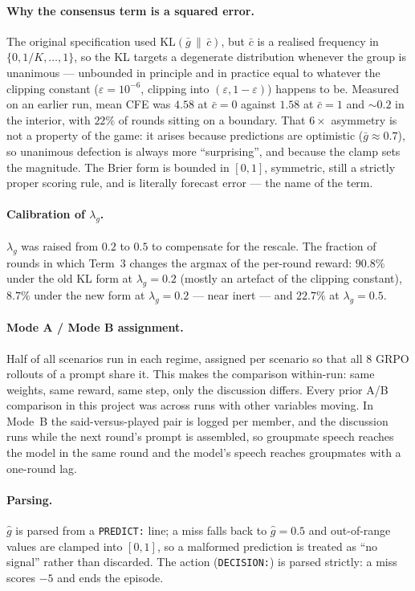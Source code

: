 \documentclass{article}
\begin{document}
\paragraph{Why the consensus term is a squared error.} The original
specification used $\mathrm{KL}(\bar g \,\|\, \bar c)$, but $\bar c$ is a
realised frequency in $\{0, 1/K, \dots, 1\}$, so the KL targets a degenerate
distribution whenever the group is unanimous --- unbounded in principle and in
practice equal to whatever the clipping constant ($\varepsilon = 10^{-6}$,
clipping into $(\varepsilon, 1-\varepsilon)$) happens to be. Measured on an
earlier run, mean CFE was $4.58$ at $\bar c = 0$ against $1.58$ at
$\bar c = 1$ and ${\sim}0.2$ in the interior, with $22\%$ of rounds sitting on
a boundary. That $6\times$ asymmetry is not a property of the game: it arises
because predictions are optimistic ($\bar g \approx 0.7$), so unanimous
defection is always more ``surprising'', and because the clamp sets the
magnitude. The Brier form is bounded in $[0,1]$, symmetric, still a strictly
proper scoring rule, and is literally forecast error --- the name of the term.

\paragraph{Calibration of $\lambda_g$.} $\lambda_g$ was raised from $0.2$ to
$0.5$ to compensate for the rescale. The fraction of rounds in which Term~3
changes the argmax of the per-round reward: $90.8\%$ under the old KL form at
$\lambda_g = 0.2$ (mostly an artefact of the clipping constant), $8.7\%$ under
the new form at $\lambda_g = 0.2$ --- near inert --- and $22.7\%$ at
$\lambda_g = 0.5$.

\paragraph{Mode A / Mode B assignment.} Half of all scenarios run in each
regime, assigned per scenario so that all $8$ GRPO rollouts of a prompt share
it. This makes the comparison within-run: same weights, same reward, same
step, only the discussion differs. Every prior A/B comparison in this project
was across runs with other variables moving. In Mode~B the said-versus-played
pair is logged per member, and the discussion runs while the next round's
prompt is assembled, so groupmate speech reaches the model in the same round
and the model's speech reaches groupmates with a one-round lag.

\paragraph{Parsing.} $\hat g$ is parsed from a \texttt{PREDICT:} line; a miss
falls back to $\hat g = 0.5$ and out-of-range values are clamped into $[0,1]$,
so a malformed prediction is treated as ``no signal'' rather than discarded.
The action (\texttt{DECISION:}) is parsed strictly: a miss scores $-5$ and
ends the episode.
\end{document}
